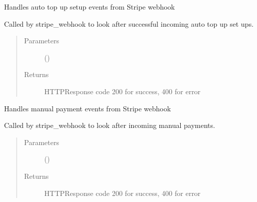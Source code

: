 \documentclass[letterpaper,10pt,english]{sphinxmanual}
\begin{document}
\begin{fulllineitems}
\label{\detokenize{payments:payments.core.stripe_webhook_autosetup}}
Handles auto top up setup events from Stripe webhook

Called by stripe\_webhook to look after successful incoming auto top up set ups.
\begin{quote}\begin{description}
\item[{Parameters}] \leavevmode
{} () \textendash{} 

\item[{Returns}] \leavevmode
HTTPResponse code \sphinxhyphen{} 200 for success, 400 for error

\end{description}\end{quote}

\end{fulllineitems}


\begin{fulllineitems}
\label{\detokenize{payments:payments.core.stripe_webhook_manual}}
Handles manual payment events from Stripe webhook

Called by stripe\_webhook to look after incoming manual payments.
\begin{quote}\begin{description}
\item[{Parameters}] \leavevmode
{} () \textendash{} 

\item[{Returns}] \leavevmode
HTTPResponse code \sphinxhyphen{} 200 for success, 400 for error

\end{description}\end{quote}

\end{fulllineitems}
\end{document}
